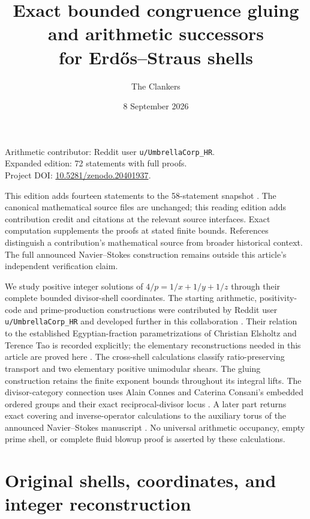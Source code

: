 \documentclass[11pt]{article}
\title{Exact bounded congruence gluing and arithmetic successors\\
for Erd\H{o}s--Straus shells}
\author{The Clankers}
\date{8 September 2026}
\theoremstyle{definition}\newtheorem{definition}[theorem]{Definition}
\theoremstyle{remark}\newtheorem{remark}[theorem]{Remark}
\begin{document}
\maketitle
\begin{center}
\small Arithmetic contributor: Reddit user \texttt{u/UmbrellaCorp\_HR}.\\
Expanded edition: 72 statements with full proofs.\\
Project DOI: \href{https://doi.org/10.5281/zenodo.20401937}{10.5281/zenodo.20401937}.
\end{center}
\noindent This edition adds fourteen statements to the 58-statement snapshot
\cite{PriorEdition}. The canonical mathematical source files are unchanged;
this reading edition adds contribution credit and citations at the relevant
source interfaces. Exact computation supplements the proofs at stated finite
bounds. References distinguish a contribution's mathematical source from
broader historical context. The full announced Navier--Stokes construction
remains outside this article's independent verification claim.
\par\medskip


We study positive integer solutions of $4/p=1/x+1/y+1/z$ through
their complete bounded divisor-shell coordinates. The starting arithmetic,
positivity-code and prime-production constructions were contributed by Reddit
user \texttt{u/UmbrellaCorp\_HR} and developed further in this collaboration
\cite{UmbrellaContribution}. Their relation to the established Egyptian-fraction
parametrizations of Christian Elsholtz and Terence Tao is recorded explicitly;
the elementary reconstructions needed in this article are proved here
\cite{ElsholtzTao}. The cross-shell calculations classify ratio-preserving
transport and two elementary positive unimodular shears. The gluing
construction retains the finite exponent bounds throughout its integral lifts.
The divisor-category connection uses Alain Connes and Caterina Consani's
embedded ordered groups and their exact reciprocal-divisor locus
\cite{CCPericyclic}. A later part returns exact covering and inverse-operator
calculations to the auxiliary torus of the announced Navier--Stokes manuscript
\cite{OpenAINS}. No universal arithmetic occupancy, empty prime shell, or
complete fluid blowup proof is asserted by these calculations.

\section{Original shells, coordinates, and integer reconstruction}
\end{document}
